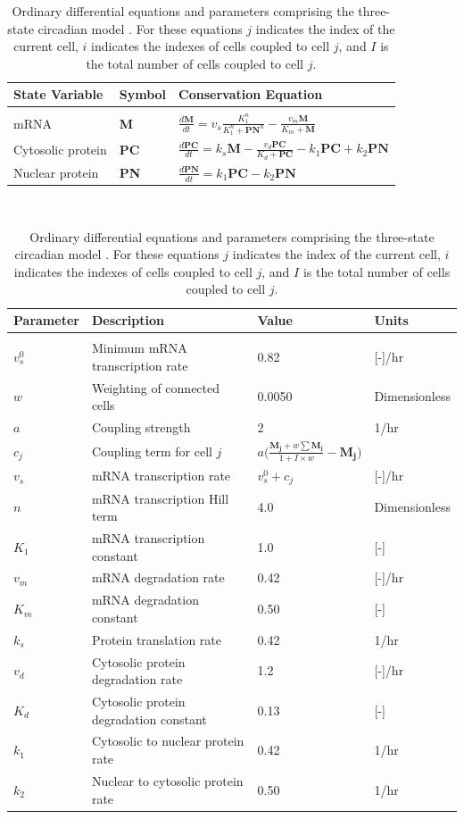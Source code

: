 \begin{table}[p]
\caption{\label{tab:s1}Ordinary differential equations and parameters comprising the three-state circadian model \cite{Gonze2006}.
    For these equations $j$ indicates the index of the current cell, $i$ indicates the indexes of cells coupled to cell $j$, and $I$ is the total number of cells coupled to cell $j$.}
\vspace{0.5cm}
\begin{center}
{
\begin{tabular}{l l l}\hline
	State Variable & Symbol & Conservation Equation\\
	\hline\\
	mRNA & \textbf{M} & $\displaystyle\frac{d\mathbf{M}}{dt} = 
	v_s\frac{K_1^n}{K_1^n + \mathbf{PN}^n} 
	- \frac{v_m\mathbf{M}}{K_m+\mathbf{M}}
	$\\[0.6cm]
	Cytosolic protein & \textbf{PC} & $\displaystyle\frac{d\mathbf{PC}}{dt} 
	= k_s\mathbf{M} - \frac{v_d\mathbf{PC}}{K_d + \mathbf{PC}} 
	- k_1\mathbf{PC} + k_2\mathbf{PN}
	$\\[0.6cm]
	Nuclear protein & \textbf{PN} & $\displaystyle\frac{d\mathbf{PN}}{dt} 
	= k_1\mathbf{PC} - k_2\mathbf{PN}
	$\\[0.6cm]
    \hline
\end{tabular}\\[1em]
\begin{tabular}{l l l l}\hline
	Parameter & Description & Value & Units\\
	\hline\\
	$v_s^0$ & Minimum mRNA transcription rate & 0.82 & [-]/hr\\
	$w$ & Weighting of connected cells & 0.0050 & Dimensionless \\
	$a$ & Coupling strength & 2 & 1/hr\\
	$c_j$ & Coupling term for cell $j$ &  
	$a\bigg(\frac{\mathbf{M_j} + w\sum \mathbf{M_i}}{1+
	I\times w} -\mathbf{M_j}\bigg)$\\
	$v_s$ & mRNA transcription rate & $\displaystyle v_s^0 + c_j$ 
	& [-]/hr \\
	$n$ & mRNA transcription Hill term & 4.0 & Dimensionless\\
	$K_1$ & mRNA transcription constant & 1.0 & [-]\\
	$v_m$ & mRNA degradation rate & 0.42 & [-]/hr\\
	$K_m$ & mRNA degradation constant & 0.50 & [-]\\
	$k_s$ & Protein translation rate & 0.42 & 1/hr\\
	$v_d$ & Cytosolic protein degradation rate & 1.2 & [-]/hr\\
	$K_d$ & Cytosolic protein degradation constant & 0.13 & [-]\\
	$k_1$ & Cytosolic to nuclear protein rate & 0.42  & 1/hr\\
	$k_2$ & Nuclear to cytosolic protein rate & 0.50 & 1/hr\\
	\hline
\end{tabular}
}
\end{center}
\end{table}


